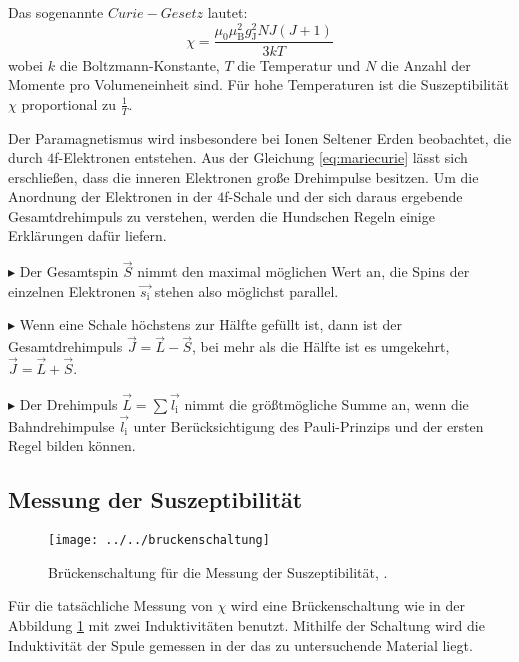 Das sogenannte $\mathit{Curie-Gesetz}$ lautet:
\begin{equation}
\label{eq:mariecurie}
\chi = \frac{\mu_0\mu_\text{B}^{2}g_\text{J}^{2}NJ(J+1)}{3kT}
\end{equation}
wobei $k$ die Boltzmann-Konstante, $T$ die Temperatur und $N$ die Anzahl der Momente pro Volumeneinheit sind. Für hohe Temperaturen ist die Suszeptibilität $\chi$ proportional zu $\frac{1}{T}$.

Der Paramagnetismus wird insbesondere bei Ionen Seltener Erden beobachtet, die durch $4$f-Elektronen entstehen. Aus der Gleichung \ref{eq:mariecurie} lässt sich erschließen, dass die inneren Elektronen große Drehimpulse besitzen. Um die Anordnung der Elektronen in der $4$f-Schale und der sich daraus ergebende Gesamtdrehimpuls zu verstehen, werden die Hundschen Regeln einige Erklärungen dafür liefern. 

$\blacktriangleright$ Der Gesamtspin $\vec{S}$ nimmt den maximal möglichen Wert an, die Spins der einzelnen Elektronen $\vec{s_\text{i}}$ stehen also möglichst parallel. 

$\blacktriangleright$ Wenn eine Schale höchstens zur Hälfte gefüllt ist, dann ist der Gesamtdrehimpuls $\vec{J} = \vec{L} - \vec{S}$, bei mehr als die Hälfte ist es umgekehrt, $\vec{J} = \vec{L} + \vec{S}$.

$\blacktriangleright$ Der Drehimpuls $\vec{L} = \sum \vec{l_\text{i}}$ nimmt die größtmögliche Summe an, wenn die Bahndrehimpulse $\vec{l_\text{i}}$ unter Berücksichtigung des Pauli-Prinzips und der ersten Regel bilden können.

\subsection{Messung der Suszeptibilität}
\begin{figure}[h!]
	\centering
	\texttt{[image: ../../bruckenschaltung]}
	\caption{Brückenschaltung für die Messung der Suszeptibilität, \cite[8]{anleitung606}.}
	\label{fig:bruckenschaltung}
\end{figure}
Für die tatsächliche Messung von $\chi$ wird eine Brückenschaltung wie in der Abbildung \ref{fig:bruckenschaltung} mit zwei Induktivitäten benutzt. Mithilfe der Schaltung wird die Induktivität der Spule gemessen in der das zu untersuchende Material liegt.

